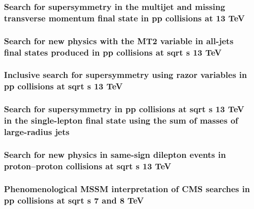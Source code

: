 \documentclass[a4paper, 11pt, twoside, openright]{report}
\begin{document}
\subsubsection{Search for supersymmetry in the multijet and missing transverse momentum final state in pp collisions at 13 TeV}

\subsubsection{Search for new physics with the MT2 variable in all-jets final states produced in pp collisions at sqrt s 13 TeV}

\subsubsection{Inclusive search for supersymmetry using razor variables in pp collisions at  sqrt s 13 TeV}

\subsubsection{Search for supersymmetry in pp collisions at sqrt s 13 TeV in the single-lepton final state using the sum of masses of large-radius jets}

\subsubsection{Search for new physics in same-sign dilepton events in proton–proton collisions at sqrt s 13 TeV}

\subsubsection{Phenomenological MSSM interpretation of CMS searches in pp collisions at sqrt s 7 and 8 TeV}

\end{document}
